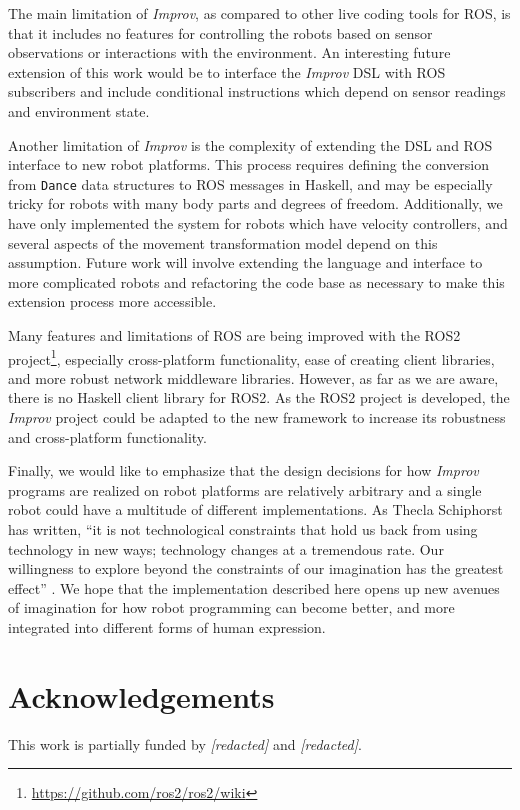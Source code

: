 \documentclass[sigchi-a]{acmart}
\begin{document}
The main limitation of \emph{Improv}, as compared to other live coding tools for
ROS, is that it includes no features for controlling the robots based on sensor
observations or interactions with the environment. An interesting future
extension of this work would be to interface the
\emph{Improv} DSL with ROS subscribers and include conditional
instructions which depend on sensor readings and environment state.

Another limitation of \emph{Improv} is the complexity of extending the DSL and
ROS interface to new robot platforms. This process requires defining the
conversion from \texttt{Dance} data structures to ROS messages in Haskell, and may be
especially tricky for robots with many body parts and degrees of freedom.
Additionally, we have only implemented the system for robots which have velocity
controllers, and several aspects of the movement transformation model depend on
this assumption. Future work will involve extending the language and interface
to more complicated robots and refactoring the code base as necessary to make
this extension process more accessible.

Many features and limitations of ROS are being improved with the ROS2
project\footnote{\url{https://github.com/ros2/ros2/wiki}},
especially cross-platform functionality, ease of creating client libraries, and
more robust network middleware libraries. However, as far as we are aware, there
is no Haskell client library for ROS2. As the ROS2 project is developed, the
\emph{Improv} project could be adapted to the new framework to increase its
robustness and cross-platform functionality.

Finally, we would like to emphasize that the design decisions for how
\emph{Improv} programs are realized on robot platforms are relatively arbitrary
and a single robot could have a multitude of different implementations. As
Thecla Schiphorst has written, ``it is not technological constraints that hold
us back from using technology in new ways; technology changes at a tremendous
rate. Our willingness to explore beyond the constraints of our imagination has
the greatest effect'' \cite{schiphorst}. We hope that the implementation
described here opens up new avenues of imagination for how robot programming can
become better, and more integrated into different forms of human expression.

\section{Acknowledgements}

This work is partially funded by \emph{[redacted]} and \emph{[redacted]}.




\end{document}
